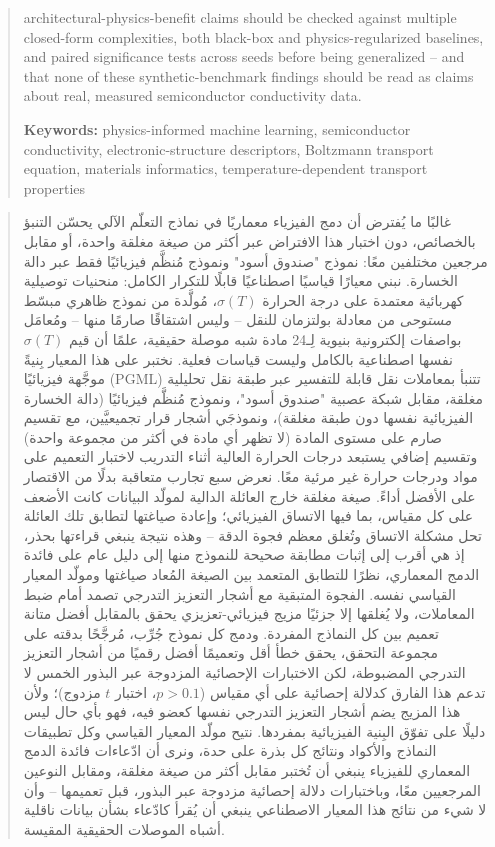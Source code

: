 \documentclass[11pt]{article}
\begin{document}
\begin{abstract}
architectural-physics-benefit claims should be checked against multiple closed-form complexities, both black-box and physics-regularized baselines, and paired significance tests across seeds before being generalized -- and that none of these synthetic-benchmark findings should be read as claims about real, measured semiconductor conductivity data.

\vspace{0.5em}
\noindent\textbf{Keywords:} physics-informed machine learning, semiconductor conductivity, electronic-structure descriptors, Boltzmann transport equation, materials informatics, temperature-dependent transport properties
\end{abstract}

\begin{otherlanguage}{arabic}
\begin{abstract}
\noindent
غالبًا ما يُفترض أن دمج الفيزياء معماريًا في نماذج التعلّم الآلي يحسّن التنبؤ بالخصائص، دون اختبار هذا الافتراض عبر أكثر من صيغة مغلقة واحدة، أو مقابل مرجعين مختلفين معًا: نموذج "صندوق أسود" ونموذج مُنظَّم فيزيائيًا فقط عبر دالة الخسارة. نبني معيارًا قياسيًا اصطناعيًا قابلًا للتكرار الكامل: منحنيات توصيلية كهربائية معتمدة على درجة الحرارة $\sigma(T)$، مُولَّدة من نموذج ظاهري مبسّط \emph{مستوحى} من معادلة بولتزمان للنقل -- وليس اشتقاقًا صارمًا منها -- ومُعامَل بواصفات إلكترونية بنيوية لِـ24 مادة شبه موصلة حقيقية، علمًا أن قيم $\sigma(T)$ نفسها اصطناعية بالكامل وليست قياسات فعلية. نختبر على هذا المعيار بِنيةً موجَّهة فيزيائيًا (PGML) تتنبأ بمعاملات نقل قابلة للتفسير عبر طبقة نقل تحليلية مغلقة، مقابل شبكة عصبية "صندوق أسود"، ونموذج مُنظَّم فيزيائيًا (دالة الخسارة الفيزيائية نفسها دون طبقة مغلقة)، ونموذجَي أشجار قرار تجميعيَّين، مع تقسيم صارم على مستوى المادة (لا تظهر أي مادة في أكثر من مجموعة واحدة) وتقسيم إضافي يستبعد درجات الحرارة العالية أثناء التدريب لاختبار التعميم على مواد ودرجات حرارة غير مرئية معًا. نعرض سبع تجارب متعاقبة بدلًا من الاقتصار على الأفضل أداءً. صيغة مغلقة خارج العائلة الدالية لمولّد البيانات كانت الأضعف على كل مقياس، بما فيها الاتساق الفيزيائي؛ وإعادة صياغتها لتطابق تلك العائلة تحل مشكلة الاتساق وتُغلق معظم فجوة الدقة -- وهذه نتيجة ينبغي قراءتها بحذر، إذ هي أقرب إلى إثبات مطابقة صحيحة للنموذج منها إلى دليل عام على فائدة الدمج المعماري، نظرًا للتطابق المتعمد بين الصيغة المُعاد صياغتها ومولّد المعيار القياسي نفسه. الفجوة المتبقية مع أشجار التعزيز التدرجي تصمد أمام ضبط المعاملات، ولا يُغلقها إلا جزئيًا مزيج فيزيائي-تعزيزي يحقق بالمقابل أفضل متانة تعميم بين كل النماذج المفردة. ودمج كل نموذج جُرِّب، مُرجَّحًا بدقته على مجموعة التحقق، يحقق خطأ أقل وتعميمًا أفضل رقميًا من أشجار التعزيز التدرجي المضبوطة، لكن الاختبارات الإحصائية المزدوجة عبر البذور الخمس لا تدعم هذا الفارق كدلالة إحصائية على أي مقياس ($p > 0.1$، اختبار $t$ مزدوج)؛ ولأن هذا المزيج يضم أشجار التعزيز التدرجي نفسها كعضو فيه، فهو بأي حال ليس دليلًا على تفوّق البِنية الفيزيائية بمفردها. نتيح مولّد المعيار القياسي وكل تطبيقات النماذج والأكواد ونتائج كل بذرة على حدة، ونرى أن ادّعاءات فائدة الدمج المعماري للفيزياء ينبغي أن تُختبر مقابل أكثر من صيغة مغلقة، ومقابل النوعين المرجعيين معًا، وباختبارات دلالة إحصائية مزدوجة عبر البذور، قبل تعميمها -- وأن لا شيء من نتائج هذا المعيار الاصطناعي ينبغي أن يُقرأ كادّعاء بشأن بيانات ناقلية أشباه الموصلات الحقيقية المقيسة.


\end{abstract}
\end{otherlanguage}
\end{document}
